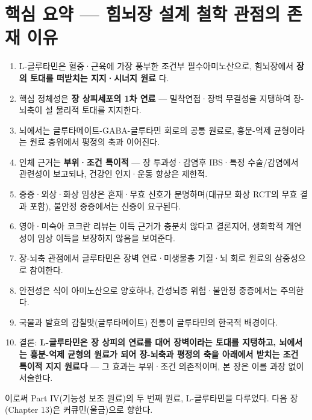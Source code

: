 \documentclass[11pt,oneside]{book}
\begin{document}
\section{핵심 요약 — 힘뇌장 설계 철학 관점의 존재 이유}
\begin{enumerate}[leftmargin=6mm,itemsep=1pt,topsep=2pt]
  \item L-글루타민은 혈중·근육에 가장 풍부한 조건부 필수아미노산으로, 힘뇌장에서 \textbf{장의 토대를 떠받치는 지지·시너지 원료} 다.
  \item 핵심 정체성은 \textbf{장 상피세포의 1차 연료} — 밀착연접·장벽 무결성을 지탱하여 장-뇌축이 설 물리적 토대를 지지한다.
  \item 뇌에서는 글루타메이트-GABA-글루타민 회로의 공통 원료로, 흥분-억제 균형이라는 원료 층위에서 평정의 축과 이어진다.
  \item 인체 근거는 \textbf{부위·조건 특이적} — 장 투과성·감염후 IBS·특정 수술/감염에서 관련성이 보고되나, 건강인 인지·운동 향상은 제한적.
  \item 중증·외상·화상 임상은 혼재·무효 신호가 분명하며(대규모 화상 RCT의 무효 결과 포함), 불안정 중증에서는 신중이 요구된다.
  \item 영아·미숙아 코크란 리뷰는 이득 근거가 충분치 않다고 결론지어, 생화학적 개연성이 임상 이득을 보장하지 않음을 보여준다.
  \item 장-뇌축 관점에서 글루타민은 장벽 연료·미생물총 기질·뇌 회로 원료의 삼중성으로 참여한다.
  \item 안전성은 식이 아미노산으로 양호하나, 간성뇌증 위험·불안정 중증에서는 주의한다.
  \item 국물과 발효의 감칠맛(글루타메이트) 전통이 글루타민의 한국적 배경이다.
  \item 결론: \textbf{L-글루타민은 장 상피의 연료를 대어 장벽이라는 토대를 지탱하고, 뇌에서는 흥분-억제 균형의 원료가 되어 장-뇌축과 평정의 축을 아래에서 받치는 조건 특이적 지지 원료다} — 그 효과는 부위·조건 의존적이며, 본 장은 이를 과장 없이 서술한다.
\end{enumerate}
이로써 Part IV(기능성 보조 원료)의 두 번째 원료, L-글루타민을 다루었다. 다음 장(Chapter 13)은 커큐민(울금)으로 향한다.
\end{document}
